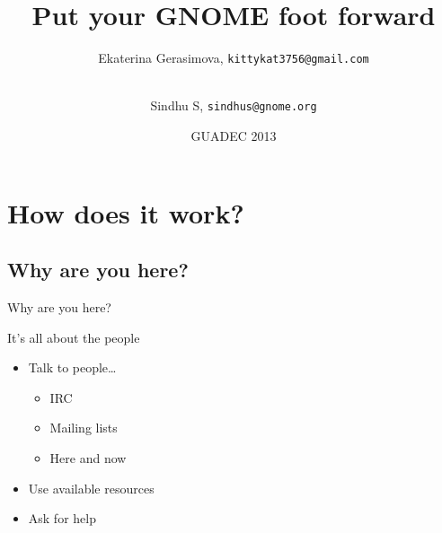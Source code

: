 \documentclass{beamer}
\title%
{Put your GNOME foot forward}
\author
{Ekaterina Gerasimova, \texttt{kittykat3756@gmail.com} \and \\Sindhu S, \texttt{sindhus@gnome.org}}
\date%
{GUADEC 2013}
\begin{document}
\begin{frame}
  \titlepage
\end{frame}






\section{How does it work?}

\subsection{Why are you here?}

\begin{frame}{Why are you here?}%
\end{frame}

\begin{frame}{It's all about the people}
  \begin{itemize}
  \item
    Talk to people\ldots
    \begin{itemize}
    \item
      IRC
    \item
      Mailing lists
    \item
      Here and now
    \end{itemize}
  \item
    Use available resources
  \item
    Ask for help
  \end{itemize}
\end{frame}
\end{document}
